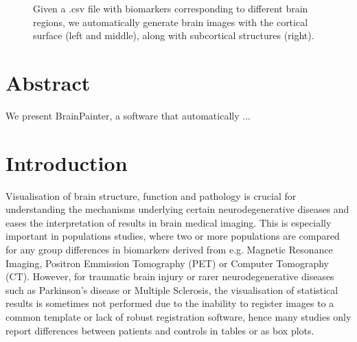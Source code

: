 \documentclass[final,5p,times,twocolumn,authoryear]{elsarticle}
\begin{document}
\begin{figure}
\caption{Given a .csv file with biomarkers corresponding to different brain regions, we automatically generate brain images with the cortical surface (left and middle), along with subcortical structures (right).}
\end{figure}







\section*{Abstract}

We present BrainPainter, a software that automatically ...


\section{Introduction}
\label{intro}



Visualisation of brain structure, function and pathology is crucial for understanding the mechanisms underlying certain neurodegenerative diseases and eases the interpretation of results in brain medical imaging. This is especially important in populations studies, where two or more populations are compared for any group differences in biomarkers derived from e.g. Magnetic Resonance Imaging, Positron Emmission Tomography (PET) or Computer Tomography (CT). However, for traumatic brain injury or rarer neurodegenerative diseases such as Parkinson's disease or Multiple Sclerosis, the visualisation of statistical results is sometimes not performed due to the inability to register images to a common template or lack of robust registration software, hence many studies  \cite{coughlin2015neuroinflammation,mak2014subcortical,schoonheim2012subcortical,chard2002brain} only report differences between patients and controls in tables or as box plots. 
\end{document}
